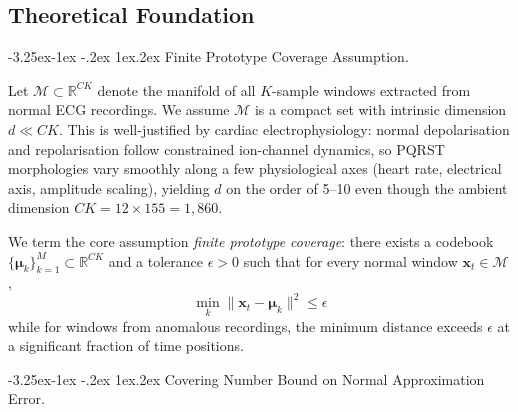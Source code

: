\documentclass{iopjournal}
\makeatletter
\renewcommand\subsubsection{\@startsection{subsubsection}{3}{\z@}%
                                     {-3.25ex\@plus -1ex \@minus -.2ex}%
                                     {1ex\@plus .2ex}%
                                     {\reset@font\normalsize\itshape}}
\makeatother
\begin{document}
\subsection{Theoretical Foundation}\label{sec:theory}


\subsubsection{Finite Prototype Coverage Assumption.}

Let $\mathcal{M} \subset \mathbb{R}^{CK}$ denote the manifold of all $K$-sample windows extracted from normal ECG recordings. We assume $\mathcal{M}$ is a compact set with intrinsic dimension $d \ll CK$. This is well-justified by cardiac electrophysiology: normal depolarisation and repolarisation follow constrained ion-channel dynamics, so PQRST morphologies vary smoothly along a few physiological axes (heart rate, electrical axis, amplitude scaling), yielding $d$ on the order of 5--10 even though the ambient dimension $CK = 12 \times 155 = 1{,}860$.

We term the core assumption \emph{finite prototype coverage}: there exists a codebook $\{\boldsymbol{\mu}_k\}_{k=1}^M \subset \mathbb{R}^{CK}$ and a tolerance $\epsilon > 0$ such that for every normal window $\mathbf{x}_t \in \mathcal{M}$,
\begin{equation}
\min_{k} \| \mathbf{x}_t - \boldsymbol{\mu}_k \|^2 \leq \epsilon
\end{equation}
while for windows from anomalous recordings, the minimum distance exceeds $\epsilon$ at a significant fraction of time positions.

\subsubsection{Covering Number Bound on Normal Approximation Error.}
\end{document}
